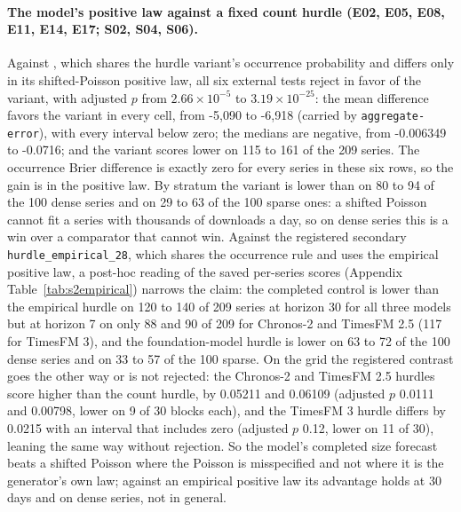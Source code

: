 \paragraph{The model's positive law against a fixed count hurdle (E02, E05, E08, E11, E14, E17; S02, S04,
S06).} Against \hc{}, which shares the hurdle variant's occurrence probability and differs only in its
shifted-Poisson positive law, all six external tests reject in favor of the variant, with adjusted $p$ from
$2.66 \times 10^{-5}$ to $3.19 \times 10^{-25}$: the mean difference favors the variant in every cell, from
-5,090 to -6,918 (carried by \texttt{aggregate-error}), with every interval below zero; the medians are
negative, from -0.006349 to -0.0716; and the variant scores lower on 115 to 161 of the 209 series. The
occurrence Brier difference is exactly zero for every series in these six rows, so the gain is in the
positive law. By stratum the variant is lower than \hc{} on 80 to 94 of the 100 dense series and on 29 to
63 of the 100 sparse ones: a shifted Poisson cannot fit a series with thousands of downloads a day, so on
dense series this is a win over a comparator that cannot win. Against the registered secondary
\texttt{hurdle\_empirical\_28}, which shares the occurrence rule and uses the empirical positive law, a
post-hoc reading of the saved per-series scores (Appendix Table~\ref{tab:s2empirical}) narrows the claim:
the completed control is lower than the empirical hurdle on 120 to 140 of 209 series at horizon 30 for all
three models but at horizon 7 on only 88 and 90 of 209 for Chronos-2 and TimesFM 2.5 (117 for TimesFM 3),
and the foundation-model hurdle is lower on 63 to 72 of the 100 dense series and on 33 to 57 of the 100
sparse. On the grid the registered contrast goes the other way or is not rejected: the Chronos-2 and TimesFM
2.5 hurdles score higher than the count hurdle, by 0.05211 and 0.06109 (adjusted $p$ 0.0111 and 0.00798,
lower on 9 of 30 blocks each), and the TimesFM 3 hurdle differs by 0.0215 with an interval that includes
zero (adjusted $p$ 0.12, lower on 11 of 30), leaning the same way without rejection. So the model's
completed size forecast beats a shifted Poisson where the Poisson is misspecified and not where it is the
generator's own law; against an empirical positive law its advantage holds at 30 days and on dense series,
not in general.

